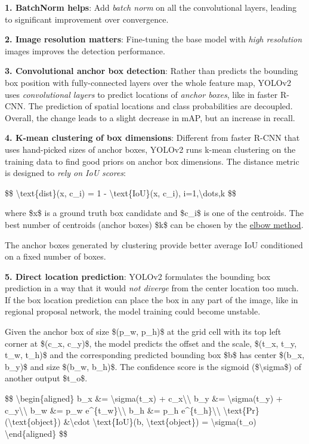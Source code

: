 \textbf{1. BatchNorm helps}: Add \emph{batch norm} on all the convolutional layers, leading to significant improvement over convergence.

\textbf{2. Image resolution matters}: Fine-tuning the base model with \emph{high resolution} images improves the detection performance.

\textbf{3. Convolutional anchor box detection}: Rather than predicts the bounding box position with fully-connected layers over the whole feature map, YOLOv2 uses \emph{convolutional layers} to predict locations of \emph{anchor boxes}, like in faster R-CNN. The prediction of spatial locations and class probabilities are decoupled. Overall, the change leads to a slight decrease in mAP, but an increase in recall.

\textbf{4. K-mean clustering of box dimensions}: Different from faster R-CNN that uses hand-picked sizes of anchor boxes, YOLOv2 runs k-mean clustering on the training data to find good priors on anchor box dimensions. The distance metric is designed to \emph{rely on IoU scores}:

\$\$ \textbackslash text\{dist\}(x, c\_i) = 1 - \textbackslash text\{IoU\}(x, c\_i), i=1,\textbackslash dots,k \$\$

where \$x\$ is a ground truth box candidate and \$c\_i\$ is one of the centroids. The best number of centroids (anchor boxes) \$k\$ can be chosen by the \href{https://en.wikipedia.org/wiki/Elbow_method_(clustering)}{elbow method}.

The anchor boxes generated by clustering provide better average IoU conditioned on a fixed number of boxes.

\textbf{5. Direct location prediction}: YOLOv2 formulates the bounding box prediction in a way that it would \emph{not diverge} from the center location too much. If the box location prediction can place the box in any part of the image, like in regional proposal network, the model training could become unstable.

Given the anchor box of size \$(p\_w, p\_h)\$ at the grid cell with its top left corner at \$(c\_x, c\_y)\$, the model predicts the offset and the scale, \$(t\_x, t\_y, t\_w, t\_h)\$ and the corresponding predicted bounding box \$b\$ has center \$(b\_x, b\_y)\$ and size \$(b\_w, b\_h)\$. The confidence score is the sigmoid (\$\textbackslash sigma\$) of another output \$t\_o\$.

\$\$ \textbackslash begin\{aligned\} b\_x \&= \textbackslash sigma(t\_x) + c\_x\textbackslash\textbackslash{} b\_y \&= \textbackslash sigma(t\_y) + c\_y\textbackslash\textbackslash{} b\_w \&= p\_w e\^{}\{t\_w\}\textbackslash\textbackslash{} b\_h \&= p\_h e\^{}\{t\_h\}\textbackslash\textbackslash{} \textbackslash text\{Pr\}(\textbackslash text\{object\}) \&\textbackslash cdot \textbackslash text\{IoU\}(b, \textbackslash text\{object\}) = \textbackslash sigma(t\_o) \textbackslash end\{aligned\} \$\$

